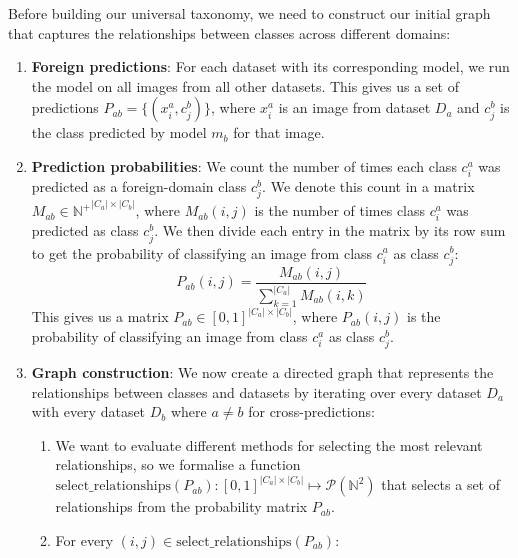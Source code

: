 Before building our universal taxonomy,
we need to construct our initial graph that captures the relationships between classes across different domains:

\begin{enumerate}
      \item \textbf{Foreign predictions}: For each dataset with its corresponding model,
            we run the model on all images from all other datasets.
            This gives us a set of predictions $P_{ab} = \{(x_i^a, c_j^b)\}$,
            where $x_i^a$ is an image from dataset $D_a$ and $c_j^b$ is the class
            predicted by model $m_b$ for that image.
      \item \textbf{Prediction probabilities}: We count the number of times each class $c_i^a$ was predicted
            as a foreign-domain class $c_j^b$.
            We denote this count in a matrix $M_{ab}\in {\mathbb{N}^+}^{|C_a| \times |C_b|}$,
            where $M_{ab}(i, j)$ is the number of times class $c_i^a$ was predicted
            as class $c_j^b$.
            We then divide each entry in the matrix by its row sum to get the
            probability of classifying an image from class $c_i^a$ as class $c_j^b$:
            \begin{equation*}
                  P_{ab}(i, j) = \frac{M_{ab}(i, j)}{\sum_{k=1}^{|C_a|} M_{ab}(i, k)}
            \end{equation*}
            This gives us a matrix $P_{ab}\in [0, 1]^{|C_a| \times |C_b|}$,
            where $P_{ab}(i, j)$ is the probability of classifying an image from class $c_i^a$
            as class $c_j^b$.
      \item \textbf{Graph construction}: We now create a directed graph that represents the relationships between classes and datasets
            by iterating over every dataset $D_a$ with every dataset $D_b$ where $a \neq b$ for cross-predictions:
            \begin{enumerate}
                  \item We want to evaluate different methods for selecting the most relevant relationships,
                        so we formalise a function $\text{select\_relationships}(P_{ab}): [0, 1]^{|C_a| \times |C_b|} \mapsto \mathcal{P}(\mathbb{N}^2)$
                        that selects a set of relationships from the probability matrix $P_{ab}$.
                  \item For every $(i, j) \in \text{select\_relationships}(P_{ab})$:
                        \begin{enumerate}

\end{enumerate}
\end{enumerate}
\end{enumerate}
